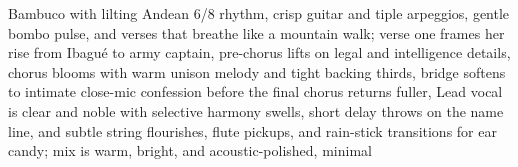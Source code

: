 
\begin{notes}
\end{notes}
\begin{style}
Bambuco with lilting Andean 6/8 rhythm, crisp guitar and tiple arpeggios, gentle bombo pulse, and verses that breathe like a mountain walk; verse one frames her rise from Ibagué to army captain, pre-chorus lifts on legal and intelligence details, chorus blooms with warm unison melody and tight backing thirds, bridge softens to intimate close-mic confession before the final chorus returns fuller, Lead vocal is clear and noble with selective harmony swells, short delay throws on the name line, and subtle string flourishes, flute pickups, and rain-stick transitions for ear candy; mix is warm, bright, and acoustic-polished, minimal
\end{style}
